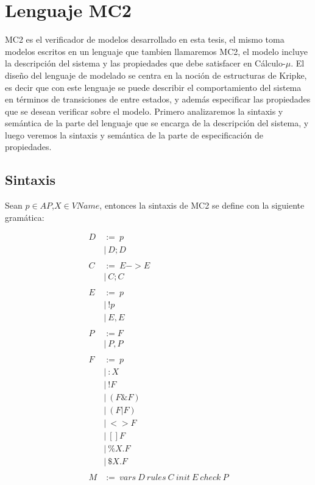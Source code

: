 \chapter{Lenguaje MC2}

MC2 es el verificador de modelos desarrollado en esta tesis, el mismo toma modelos escritos en un lenguaje que tambien llamaremos MC2, el modelo incluye la descripción del sistema y las propiedades que debe satisfacer en Cálculo-$\mu$. El diseño del lenguaje de modelado se centra en la noción de estructuras de Kripke, es decir que con este lenguaje se puede describir el comportamiento del sistema en términos de transiciones de entre estados, y además especificar las propiedades que se desean verificar sobre el modelo. Primero analizaremos la sintaxis y semántica de la parte del lenguaje que se encarga de la descripción del sistema, y luego veremos la sintaxis y semántica de la parte de especificación de propiedades.

\section{Sintaxis}
Sean $p \in AP$,$X \in VName$, entonces la sintaxis de MC2 se define con la siguiente gramática:

\begin{align*}
D &:=\ p \\
   &|\ D;D \\
\\
C &:=\ E->E \\
   &|\ C;C \\
\\
E &:=\ p \\
   &|\ !p \\
   &|\ E,E \\
\\
P &:= F \\
   &|\ P,P \\
\\
F &:=\ p \\
   &|\ :X \\
   &|\ !F \\
   &|\ (F \& F) \\
   &|\ (F | F) \\
   &|\ <>F \\
   &|\ []F \\
   &|\ \%X.F \\
   &|\ \$X.F \\ 
\\
M &:=\ vars\ D\ rules\ C\ init\ E\ check\ P \\
\end{align*}

